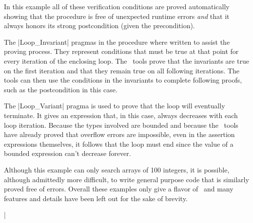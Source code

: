 In this example all of these verification conditions are proved automatically showing that the
procedure is free of unexpected runtime errors \emph{and} that it always honors its strong
postcondition (given the precondition).

The |Loop_Invariant| pragmas in the procedure where written to assist the proving process. They
represent conditions that must be true at that point for every iteration of the enclosing loop.
The \SPARK\ tools prove that the invariants are true on the first iteration and that they remain
true on all following iterations. The tools can then use the conditions in the invariants to
complete following proofs, such as the postcondition in this case.

The |Loop_Variant| pragma is used to prove that the loop will eventually terminate. It gives an
expression that, in this case, always decreases with each loop iteration. Because the types
involved are bounded and because the \SPARK\ tools have already proved that overflow errors are
impossible, even in the assertion expressions themselves, it follows that the loop must end
since the value of a bounded expression can't decrease forever.

Although this example can only search arrays of 100 integers, it is possible, although
admittedly more difficult, to write general purpose code that is similarly proved free of
errors. Overall these examples only give a flavor of \SPARK\ and many features and details have
been left out for the sake of brevity.

\lstDeleteShortInline|
